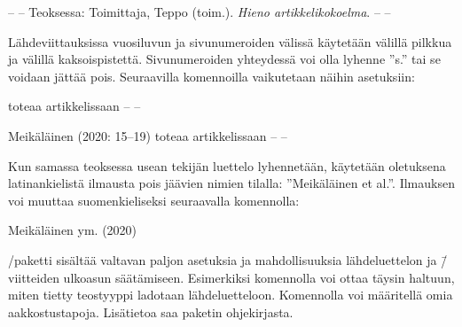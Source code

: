
\begin{koodilohkosis}
  \usepackage[style=ext-authoryear, innamebeforetitle=true]{biblatex}

\end{koodilohkosis}

\begin{tulossis}
  -- -- Teoksessa: Toimittaja, Teppo (toim.). \emph{Hieno
    artikkelikokoelma}. -- --
\end{tulossis}

Lähdeviittauksissa vuosiluvun ja sivunumeroiden välissä käytetään
välillä pilkkua ja välillä kaksoispistettä. Sivunumeroiden yhteydessä
voi olla lyhenne ''s.'' tai se voidaan jättää pois. Seuraavilla
komennoilla vaikutetaan näihin asetuksiin:


\begin{koodilohkosis}

  \textcite[15--19]{tunniste} toteaa artikkelissaan -- --
\end{koodilohkosis}

\begin{tulossis}
  Meikäläinen (2020: 15--19) toteaa artikkelissaan -- --
\end{tulossis}

Kun samassa teoksessa usean tekijän luettelo lyhennetään, käytetään
oletuksena latinankielistä ilmausta pois jäävien nimien tilalla:
''Meikäläinen et al.''. Ilmauksen voi muuttaa suomenkieliseksi
seuraavalla komennolla:


\begin{koodilohkosis}
\end{koodilohkosis}

\begin{tulossis}
  Meikäläinen ym. (2020)
\end{tulossis}

\-/paketti sisältää valtavan paljon asetuksia ja
mahdollisuuksia lähdeluettelon ja \=/viitteiden ulkoasun säätämiseen.
Esimerkiksi komennolla  voi ottaa täysin haltuun,
miten tietty teostyyppi ladotaan lähdeluetteloon. Komennolla
 voi määritellä omia
aakkostustapoja. Lisätietoa saa paketin ohjekirjasta.

